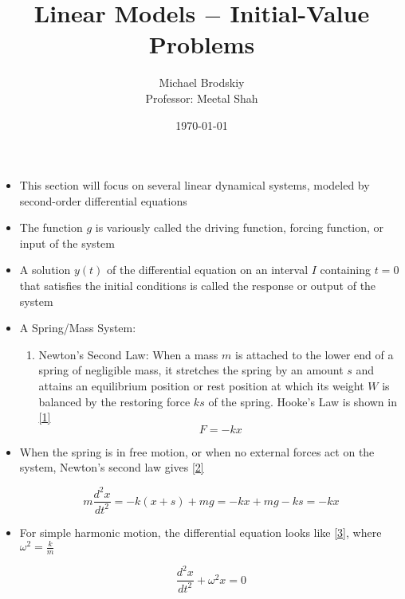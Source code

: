 \documentclass[12pt]{article}
\title{Linear Models $-$ Initial-Value Problems}
\date{\today}
\author{Michael Brodskiy\\ \small Professor: Meetal Shah}
\begin{document}
\maketitle

\begin{itemize}

  \item This section will focus on several linear dynamical systems, modeled by second-order differential equations

  \item The function $g$ is variously called the driving function, forcing function, or input of the system

  \item A solution $y(t)$ of the differential equation on an interval $I$ containing $t=0$ that satisfies the initial conditions is called the response or output of the system

  \item A Spring/Mass System:

    \begin{enumerate}

      \item Newton's Second Law: When a mass $m$ is attached to the lower end of a spring of negligible mass, it stretches the spring by an amount $s$ and attains an equilibrium position or rest position at which its weight $W$ is balanced by the restoring force $ks$ of the spring. Hooke's Law is shown in \eqref{1}
        \begin{equation}
          F=-kx
          \label{1}
        \end{equation}

    \end{enumerate}

  \item When the spring is in free motion, or when no external forces act on the system, Newton's second law gives \eqref{2}

    \begin{equation}
      m\frac{d^2x}{dt^2}=-k(x+s)+mg=-kx+mg-ks=-kx
      \label{2}
    \end{equation}

  \item For simple harmonic motion, the differential equation looks like \eqref{3}, where $\omega^2=\frac{k}{m}$

    \begin{equation}
      \frac{d^2x}{dt^2}+\omega^2x=0
      \label{3}
    \end{equation}


\end{itemize}
\end{document}
